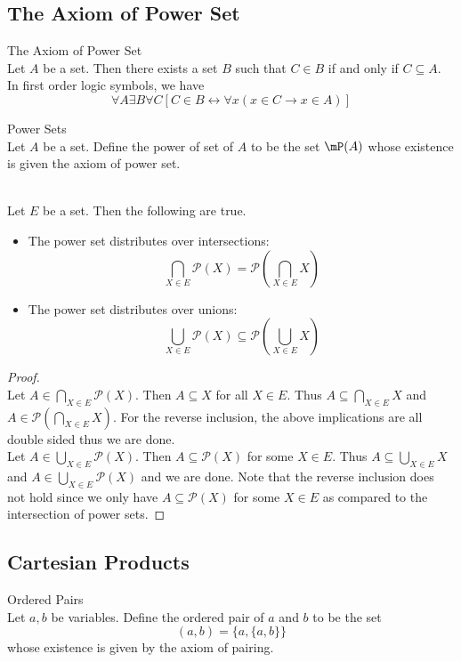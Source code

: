 \documentclass[a4paper]{article}
\begin{document}
\subsection{The Axiom of Power Set}
\begin{axm}{The Axiom of Power Set}{}\\
Let $A$ be a set. Then there exists a set $B$ such that $C\in B$ if and only if $C\subseteq A$. In first order logic symbols, we have $$\forall A\exists B\forall C\left[C\in B\leftrightarrow\forall x(x\in C\to x\in A)\right]$$
\end{axm}

\begin{defn}{Power Sets}{}\\
Let $A$ be a set. Define the power of set of $A$ to be the set $\mP(A)$ whose existence is given the axiom of power set. 
\end{defn}

\begin{prp}{}{}\\
Let $E$ be a set. Then the following are true. 
\begin{itemize}
\item The power set distributes over intersections: $$\bigcap_{X\in E}\mathcal{P}(X)=\mathcal{P}\left(\bigcap_{X\in E}X\right)$$
\item The power set distributes over unions: $$\bigcup_{X\in E}\mathcal{P}(X)\subseteq\mathcal{P}\left(\bigcup_{X\in E}X\right)$$
\end{itemize}
\begin{proof}\\
Let $A\in\bigcap_{X\in E}\mathcal{P}(X)$. Then $A\subseteq X$ for all $X\in E$. Thus $A\subseteq\bigcap_{X\in E}X$ and $A\in\mathcal{P}(\bigcap_{X\in E}X)$. For the reverse inclusion, the above implications are all double sided thus we are done. \\
Let $A\in\bigcup_{X\in E}\mathcal{P}(X)$. Then $A\subseteq\mathcal{P}(X)$ for some $X\in E$. Thus $A\subseteq\bigcup_{X\in E}X$ and $A\in\bigcup_{X\in E}\mathcal{P}(X)$ and we are done. Note that the reverse inclusion does not hold since we only have $A\subseteq\mathcal{P}(X)$ for some $X\in E$ as compared to the intersection of power sets. 
\end{proof}
\end{prp}

\subsection{Cartesian Products}
\begin{defn}{Ordered Pairs}{}\\
Let $a,b$ be variables. Define the ordered pair of $a$ and $b$ to be the set $$(a,b)=\{a,\{a,b\}\}$$ whose existence is given by the axiom of pairing. 
\end{defn}
\end{document}
